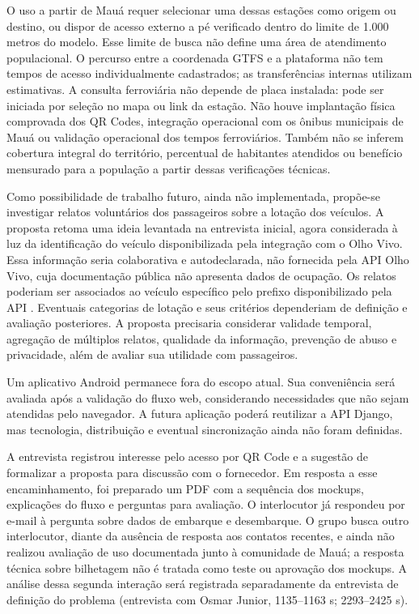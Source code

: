 \documentclass[12pt,oneside,a4paper,brazil,chapter=TITLE]{abntex2}
\begin{document}
O uso a partir de Mauá requer selecionar uma dessas estações como origem ou destino, ou dispor de acesso externo a pé verificado dentro do limite de 1.000 metros do modelo. Esse limite de busca não define uma área de atendimento populacional. O percurso entre a coordenada GTFS e a plataforma não tem tempos de acesso individualmente cadastrados; as transferências internas utilizam estimativas. A consulta ferroviária não depende de placa instalada: pode ser iniciada por seleção no mapa ou link da estação. Não houve implantação física comprovada dos QR Codes, integração operacional com os ônibus municipais de Mauá ou validação operacional dos tempos ferroviários. Também não se inferem cobertura integral do território, percentual de habitantes atendidos ou benefício mensurado para a população a partir dessas verificações técnicas.



Como possibilidade de trabalho futuro, ainda não implementada, propõe-se investigar relatos voluntários dos passageiros sobre a lotação dos veículos. A proposta retoma uma ideia levantada na entrevista inicial, agora considerada à luz da identificação do veículo disponibilizada pela integração com o Olho Vivo. Essa informação seria colaborativa e autodeclarada, não fornecida pela API Olho Vivo, cuja documentação pública não apresenta dados de ocupação. Os relatos poderiam ser associados ao veículo específico pelo prefixo disponibilizado pela API \citep{sptransapi}. Eventuais categorias de lotação e seus critérios dependeriam de definição e avaliação posteriores. A proposta precisaria considerar validade temporal, agregação de múltiplos relatos, qualidade da informação, prevenção de abuso e privacidade, além de avaliar sua utilidade com passageiros.

Um aplicativo Android permanece fora do escopo atual. Sua conveniência será avaliada após a validação do fluxo web, considerando necessidades que não sejam atendidas pelo navegador. A futura aplicação poderá reutilizar a API Django, mas tecnologia, distribuição e eventual sincronização ainda não foram definidas.

A entrevista registrou interesse pelo acesso por QR Code e a sugestão de formalizar a proposta para discussão com o fornecedor. Em resposta a esse encaminhamento, foi preparado um PDF com a sequência dos mockups, explicações do fluxo e perguntas para avaliação. O interlocutor já respondeu por e-mail à pergunta sobre dados de embarque e desembarque. O grupo busca outro interlocutor, diante da ausência de resposta aos contatos recentes, e ainda não realizou avaliação de uso documentada junto à comunidade de Mauá; a resposta técnica sobre bilhetagem não é tratada como teste ou aprovação dos mockups. A análise dessa segunda interação será registrada separadamente da entrevista de definição do problema  (entrevista com Osmar Junior, 1135--1163 s; 2293--2425 s).
\end{document}
